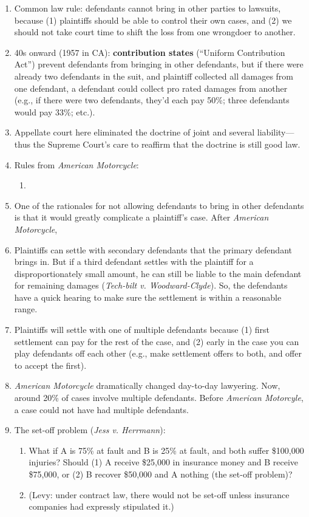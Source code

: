 \begin{enumerate}
    \item Common law rule: defendants cannot bring in other parties to lawsuits, because (1) plaintiffs should be able to control their own cases, and (2) we should not take court time to shift the loss from one wrongdoer to another.
    \item 40s onward (1957 in CA): \textbf{contribution states} (``Uniform Contribution Act'') prevent defendants from bringing in other defendants, but if there were already two defendants in the suit, and plaintiff collected all damages from one defendant, a defendant could collect pro rated damages from another (e.g., if there were two defendants, they'd each pay 50\%; three defendants would pay 33\%; etc.).
    \item Appellate court here eliminated the doctrine of joint and several liability---thus the Supreme Court's care to reaffirm that the doctrine is still good law.
    \item Rules from \emph{American Motorcycle}:
    \begin{enumerate}
        \item %
    \end{enumerate}
    \item One of the rationales for not allowing defendants to bring in other defendants is that it would greatly complicate a plaintiff's case. After \emph{American Motorcycle}, 
    \item Plaintiffs can settle with secondary defendants that the primary defendant brings in. But if a third defendant settles with the plaintiff for a disproportionately small amount, he can still be liable to the main defendant for remaining damages (\emph{Tech-bilt v. Woodward-Clyde}). So, the defendants have a quick hearing to make sure the settlement is within a reasonable range.
    \item Plaintiffs will settle with one of multiple defendants because (1) first settlement can pay for the rest of the case, and (2) early in the case you can play defendants off each other (e.g., make settlement offers to both, and offer to accept the first).
    \item \emph{American Motorcycle} dramatically changed day-to-day lawyering. Now, around 20\% of cases involve multiple defendants. Before \emph{American Motorcyle}, a case could not have had multiple defendants.
    \item The set-off problem (\emph{Jess v. Herrmann}):
    \begin{enumerate}
        \item What if A is 75\% at fault and B is 25\% at fault, and both suffer \$100,000 injuries? Should (1) A receive \$25,000 in insurance money and B receive \$75,000, or (2) B recover \$50,000 and A nothing (the set-off problem)?
        \item (Levy: under contract law, there would not be set-off unless insurance companies had expressly stipulated it.)
    \end{enumerate}
\end{enumerate}

